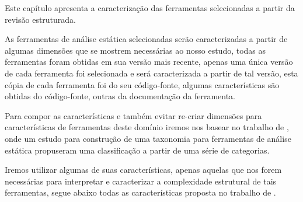 {Este capítulo apresenta a caracterização das ferramentas selecionadas a partir
da revisão estruturada.}
\label{caracterizacao-ferramentas}

As ferramentas de análise estática selecionadas serão caracterizadas
a partir de algumas dimensões que se mostrem necessárias ao nosso estudo, todas
as ferramentas foram obtidas em sua versão mais recente, apenas uma única versão
de cada ferramenta foi selecionada e será caracterizada a partir de tal versão,
esta cópia de cada ferramenta foi do seu código-fonte, algumas características
são obtidas do código-fonte, outras da documentação da ferramenta.

Para compor as características e também evitar re-criar dimensões para características
de ferramentas deste domínio iremos nos basear no trabalho de
, onde um estudo para construção de uma taxonomia para
ferramentas de análise estática propuseram uma classificação a partir de uma
série de categorias.

Iremos utilizar algumas de suas características, apenas aquelas que nos forem necessárias
para interpretar e caracterizar a complexidade estrutural de tais ferramentas, segue abaixo todas
as características proposta no trabalho de .

